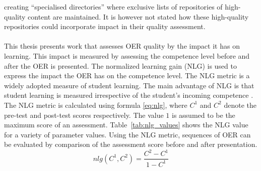 creating “specialised directories” where exclusive lists of repositories of
high-quality content are maintained. It is however not stated how these
high-quality repositories could incorporate impact in their quality
assessment.\\\\
\noindent
This thesis presents work that assesses OER quality by the impact it has on
learning. This impact is measured by assessing the competence level before and
after the OER is presented. The normalized learning gain (NLG) is used to express the
impact the OER has on the competence level. The NLG metric is a widely adopted
measure of student learning. The main advantage of NLG is that student learning
is measured irrespective of the student's incoming competence \citep{Chi2010}.
The NLG metric is calculated using formula \eqref{eq:nlg}, where $C^1$ and
$C^2$ denote the pre-test and post-test scores respectively. The value $1$ is
assumed to be the maximum score of an assessment. Table~\ref{tab:nlg_values}
shows the NLG value for a variety of parameter values. Using the NLG metric,
sequences of OER can be evaluated by comparison of the assessment score before
and after presentation.
\begin{equation}
	nlg(C^1, C^2) = \frac{C^2-C^1}{1-C^1}
	\label{eq:nlg}
\end{equation}

